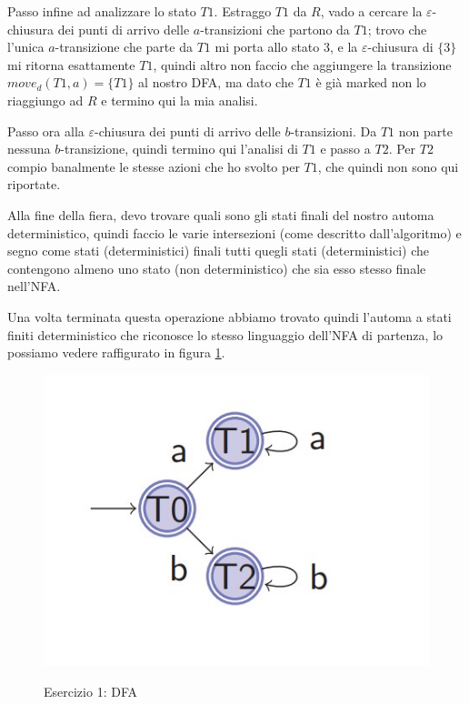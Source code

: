 \documentclass[class=book, crop=false, oneside, 12pt]{standalone}
\begin{document}
Passo infine ad analizzare lo stato \(T1\). Estraggo \(T1\) da \(R\), vado a cercare la \(\varepsilon\)-chiusura dei punti di arrivo delle \(a\)-transizioni che partono da \(T1\); trovo che l'unica \(a\)-transizione che parte da \(T1\) mi porta allo stato 3, e la \(\varepsilon\)-chiusura di \(\{3\}\) mi ritorna esattamente \(T1\), quindi altro non faccio che aggiungere la transizione \(move_d(T1, a)=\{T1\}\) al nostro DFA, ma dato che \(T1\) è già marked non lo riaggiungo ad \(R\) e termino qui la mia analisi.

Passo ora alla \(\varepsilon\)-chiusura dei punti di arrivo delle \(b\)-transizioni. Da \(T1\) non parte nessuna \(b\)-transizione, quindi termino qui l'analisi di \(T1\) e passo a \(T2\).
Per \(T2\) compio banalmente le stesse azioni che ho svolto per \(T1\), che quindi non sono qui riportate.

Alla fine della fiera, devo trovare quali sono gli stati finali del nostro automa deterministico, quindi faccio le varie intersezioni (come descritto dall'algoritmo) e segno come stati (deterministici) finali tutti quegli stati (deterministici) che contengono almeno uno stato (non deterministico) che sia esso stesso finale nell'NFA.

Una volta terminata questa operazione abbiamo trovato quindi l’automa a stati finiti deterministico che riconosce lo stesso linguaggio dell’NFA di partenza, lo possiamo vedere raffigurato in figura \ref{sol_sc_1}.
\begin{figure}[H]
    \centering
    \includegraphics[width=.7\textwidth,keepaspectratio]{s1_subset_construction.jpg}
    \label{sol_sc_1}
    \caption{Esercizio 1: DFA}
\end{figure}
\end{document}

